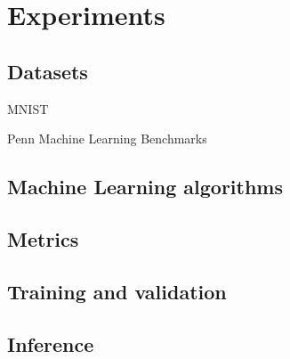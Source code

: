 \section{Experiments}
\subsection{Datasets}
MNIST \parencite{dengMNISTDatabaseHandwritten2012}

Penn Machine Learning Benchmarks \parencite{olsonPMLBLargeBenchmark2017}




\subsection{Machine Learning algorithms}
\subsection{Metrics}
\subsection{Training and validation}
\subsection{Inference}

